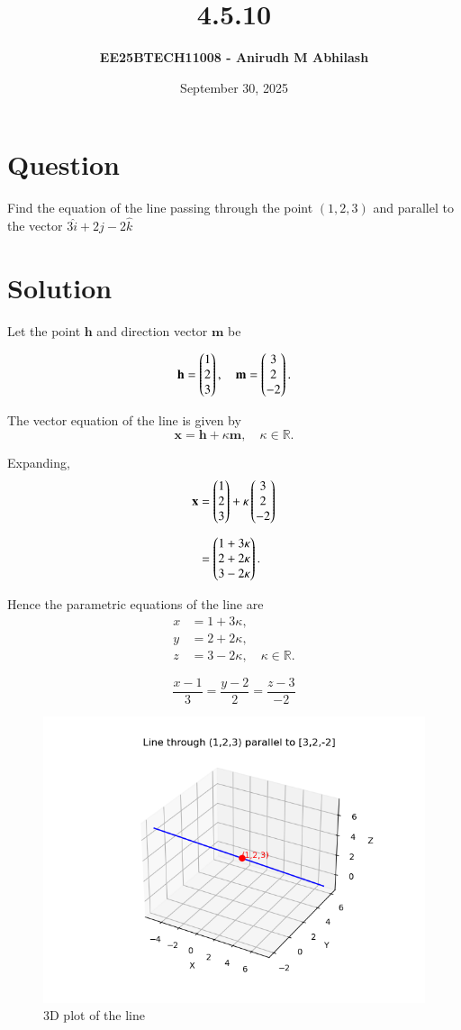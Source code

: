 \documentclass[12pt]{article}
\title{\textbf{4.5.10}}
\author{\textbf{EE25BTECH11008 - Anirudh M Abhilash}}
\date{September 30, 2025}
\begin{document}
\maketitle

\section*{Question}

Find the equation of the line passing through the point $(1,2,3)$ and parallel to the vector $3\hat{i} + 2\hat{j} - 2\hat{k}$

\section*{Solution}

Let the point $\mathbf{h}$ and direction vector $\mathbf{m}$ be  

\[
\mathbf{h} = \begin{pmatrix}1 \\ 2 \\ 3\end{pmatrix}, \quad 
\mathbf{m} = \begin{pmatrix}3 \\ 2 \\ -2\end{pmatrix}.
\]

The vector equation of the line is given by
\[
\mathbf{x} = \mathbf{h} + \kappa \mathbf{m}, \quad \kappa \in \mathbb{R}.
\]

Expanding,  
\begin{align}
\mathbf{x} &= \begin{pmatrix}1 \\ 2 \\ 3\end{pmatrix} + \kappa \begin{pmatrix}3 \\ 2 \\ -2\end{pmatrix} \\[2mm]
           &= \begin{pmatrix}1 + 3\kappa \\ 2 + 2\kappa \\ 3 - 2\kappa\end{pmatrix}.
\end{align}

Hence the parametric equations of the line are  
\begin{align}
x &= 1 + 3\kappa, \\ 
y &= 2 + 2\kappa, \\ 
z &= 3 - 2\kappa, \quad \kappa \in \mathbb{R}.
\end{align}

\[
\boxed{\frac{x - 1}{3} = \frac{y - 2}{2} = \frac{z - 3}{-2}}
\]

\begin{figure}[H]\centering
\includegraphics[width=1\columnwidth]{figs/plt.png}
\caption{3D plot of the line}
\label{fig:plt}
\end{figure}
\end{document}
